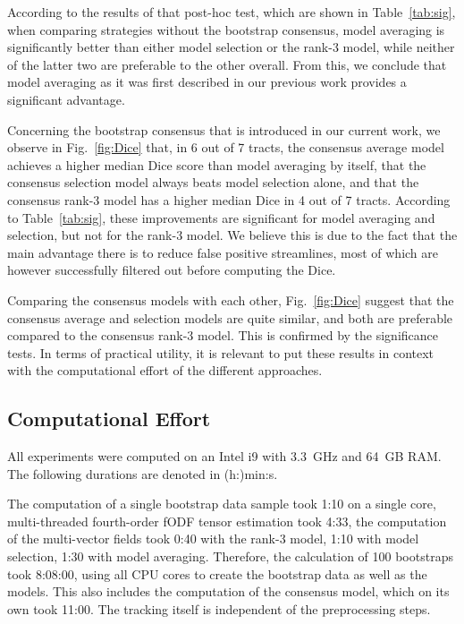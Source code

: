 According to the results of that post-hoc test, which are shown in Table~\ref{tab:sig}, when comparing strategies without the bootstrap consensus,
model averaging is significantly better than either model selection or the rank-3 model, while neither of the latter two are preferable to the other overall. From this, we conclude that model averaging as it was first described in our previous work \cite{Gruen:2021} provides a significant advantage.

Concerning the bootstrap consensus that is introduced in our current work, we observe in Fig.~\ref{fig:Dice} that, in 6 out of 7 tracts, the consensus average model achieves a higher median Dice score than model averaging by itself, that the consensus selection model always beats model selection alone, and that the consensus rank-3 model has a higher median Dice in 4 out of 7
tracts. According to Table~\ref{tab:sig}, these improvements are significant for model averaging and selection, but not for the rank-3 model. We believe this is due to the fact that the main advantage there is to reduce false positive streamlines, most of which are however successfully filtered out before computing the Dice.

Comparing the consensus models with each other, Fig.~\ref{fig:Dice} suggest that the consensus average and selection models are quite similar, and both are
preferable compared to the consensus rank-3 model. This is confirmed by the significance tests. In terms of practical utility, it is relevant to put these results in context with the computational effort of the different approaches.

\subsection{Computational Effort}
All experiments were computed on an Intel i9 with 3.3~GHz and 64~GB RAM. The
following durations are denoted in (h:)min:s.

The computation of a single bootstrap data sample took 1:10 on a single core,
multi-threaded fourth-order fODF tensor estimation took 4:33, the computation of the multi-vector fields took 0:40 with the rank-3 model, 1:10 with model selection, 1:30 with model averaging. Therefore, the calculation of 100 bootstraps took 8:08:00, using all CPU cores to create the bootstrap data as well as the
models. This also includes the computation of the consensus model, which on its
own took 11:00. The tracking itself is independent of the preprocessing steps. 

